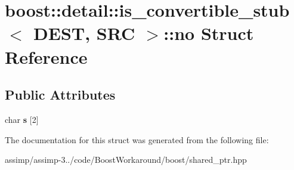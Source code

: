 \hypertarget{structboost_1_1detail_1_1is__convertible__stub_1_1no}{\section{boost\+:\+:detail\+:\+:is\+\_\+convertible\+\_\+stub$<$ D\+E\+S\+T, S\+R\+C $>$\+:\+:no Struct Reference}
\label{structboost_1_1detail_1_1is__convertible__stub_1_1no}
}
\subsection*{Public Attributes}
\begin{DoxyCompactItemize}
\item 
\hypertarget{structboost_1_1detail_1_1is__convertible__stub_1_1no_ac8e33ec48d43a3b3a0d1f1100edaaf63}{char {\bfseries s} \mbox{[}2\mbox{]}}\label{structboost_1_1detail_1_1is__convertible__stub_1_1no_ac8e33ec48d43a3b3a0d1f1100edaaf63}

\end{DoxyCompactItemize}


The documentation for this struct was generated from the following file\+:\begin{DoxyCompactItemize}
\item 
assimp/assimp-\/3../code/\+Boost\+Workaround/boost/shared\+\_\+ptr.\+hpp\end{DoxyCompactItemize}
